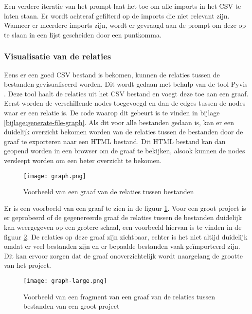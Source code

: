 Een verdere iteratie van het prompt laat het toe om alle imports in het CSV te laten staan. 
Er wordt achteraf gefilterd op de imports die niet relevant zijn. 
Wanneer er meerdere imports zijn, wordt er gevraagd aan de prompt om deze op te slaan in een lijst gescheiden door een puntkomma.

\subsubsection{Visualisatie van de relaties}
\label{subsec:project-documentatie-relaties-visualisatie}

Eens er een goed CSV bestand is bekomen, kunnen de relaties tussen de bestanden gevisualiseerd worden.
Dit wordt gedaan met behulp van de tool Pyvis \autocite{WHIR2018}.
Deze tool haalt de relaties uit het CSV bestand en voegt deze toe aan een graaf. 
Eerst worden de verschillende nodes toegevoegd en dan de edges tussen de nodes waar er een relatie is. 
De code waarop dit gebeurt is te vinden in bijlage \ref{bijlage:generate-file-graph}.
Als dit voor alle bestanden gedaan is, kan er een duidelijk overzicht bekomen worden van de relaties tussen de bestanden door de graaf te exporteren naar een HTML bestand.
Dit HTML bestand kan dan geopend worden in een browser om de graaf te bekijken, alsook kunnen de nodes versleept worden om een beter overzicht te bekomen.

\begin{figure}[h]
    \centering
    \texttt{[image: graph.png]}
    \caption{Voorbeeld van een graaf van de relaties tussen bestanden}
    \label{fig:graph}
\end{figure}

Er is een voorbeeld van een graaf te zien in de figuur \ref{fig:graph}. 
Voor een groot project is er geprobeerd of de gegenereerde graaf de relaties tussen de bestanden duidelijk kan weergegeven op een grotere schaal, een voorbeeld hiervan is te vinden in de figuur \ref{fig:graph-large}.
De relaties op deze graaf zijn zichtbaar, echter is het niet altijd duidelijk omdat er veel bestanden zijn en er bepaalde bestanden vaak geïmporteerd zijn.
Dit kan ervoor zorgen dat de graaf onoverzichtelijk wordt naargelang de grootte van het project.

\begin{figure}[h]
    \centering
    \texttt{[image: graph-large.png]}
    \caption{Voorbeeld van een fragment van een graaf van de relaties tussen bestanden van een groot project}
    \label{fig:graph-large}
\end{figure}

